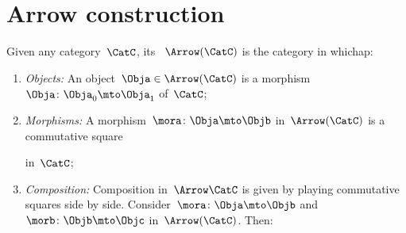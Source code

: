 
\section{Arrow construction}


\begin{ctdefinition}
    \label{def:arrow_category}
    Given any category~$\CatC$, its \emph{}~$\Arrow(\CatC)$ is the category in whichap:
    \begin{enumerate}
        \item \emph{Objects:} An object~$\Obja \in \Arrow(\CatC)$ is a morphism~$\Obja\colon \Obja_0\mto \Obja_1$ of~$\CatC$;
        \item \emph{Morphisms:} A morphism~$\mora\colon \Obja \mto \Objb$ in~$\Arrow(\CatC)$ is a commutative square
              \begin{center}
              \end{center}
              in~$\CatC$;
        \item \emph{Composition:} Composition in~$\Arrow \CatC$ is given by playing commutative squares side by side.
         Consider~$\mora\colon \Obja \mto \Objb$ and~$\morb\colon \Objb \mto \Objc$ in~$\Arrow(\CatC)$.
              Then:
        \begin{center}
        \end{center}
    \end{enumerate}
\end{ctdefinition}
